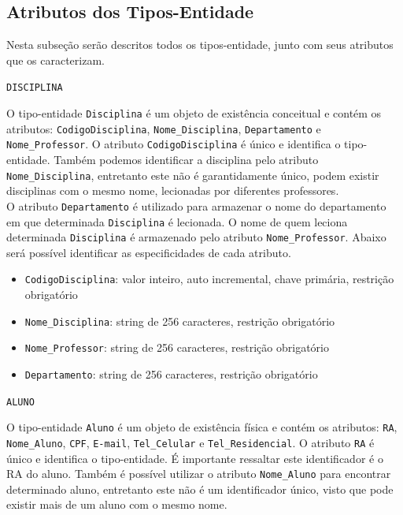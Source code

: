 \documentclass[12pt,a4paper]{article}
\begin{document}
\subsection{Atributos dos Tipos-Entidade} \label{atributos_entidades}

Nesta subseção serão descritos todos os tipos-entidade, junto com seus atributos que os caracterizam.

\vspace{0.5cm}
\begin{center}
    \texttt{DISCIPLINA}
\end{center}

\hspace{6}O tipo-entidade {\texttt{Disciplina}} é um objeto de existência conceitual e contém os atributos: {\texttt{CodigoDisciplina}}, {\texttt{Nome\_Disciplina}}, {\texttt{Departamento}} e {\texttt{Nome\_Professor}}. O atributo {\texttt{CodigoDisciplina}} é único e identifica o tipo-entidade. Também podemos identificar a disciplina pelo atributo {\texttt{Nome\_Disciplina}}, entretanto este não é garantidamente único, podem existir disciplinas com o mesmo nome, lecionadas por diferentes professores.\\

O atributo {\texttt{Departamento}} é utilizado para armazenar o nome do departamento em que determinada \texttt{Disciplina} é lecionada. O nome de quem leciona determinada \texttt{Disciplina} é armazenado pelo atributo {\texttt{Nome\_Professor}}. Abaixo será possível identificar as especificidades de cada atributo. \\

\begin{itemize}
    \item {\texttt{CodigoDisciplina}}: valor inteiro, auto incremental, chave primária, restrição obrigatório
    \item {\texttt{Nome\_Disciplina}}: string de 256 caracteres, restrição obrigatório
    \item {\texttt{Nome\_Professor}}: string de 256 caracteres, restrição obrigatório
    \item {\texttt{Departamento}}: string de 256 caracteres, restrição obrigatório
\end{itemize}

\vspace{0.5cm}
\begin{center}
    \texttt{ALUNO}
\end{center}

O tipo-entidade {\texttt{Aluno}} é um objeto de existência física e contém os atributos: {\texttt{RA}}, {\texttt{Nome\_Aluno}}, {\texttt{CPF}}, {\texttt{E-mail}}, {\texttt{Tel\_Celular} e \texttt{Tel\_Residencial}}. O atributo {\texttt{RA}} é único e identifica o tipo-entidade. É importante ressaltar este identificador é o RA do aluno. Também é possível utilizar o atributo {\texttt{Nome\_Aluno}} para encontrar determinado aluno, entretanto este não é um identificador único, visto que pode existir mais de um aluno com o mesmo nome.\\
\end{document}
